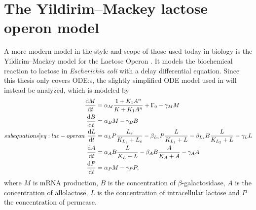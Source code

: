 \section{The Yildirim--Mackey lactose operon model}

A more modern model in the style and scope of those used today in biology is the Yildirim--Mackey model for the Lactose Operon \cite{yildirim2003feedback}.
It models the biochemical reaction to lactose in \textit{Escherichia coli} with a delay differential equation.
Since this thesis only covers ODE:s, the slightly simplified ODE model used in \cite{yildirim2011deterministic} will instead be analyzed, which is modeled by
\begin{subequations} \label[subequations]{eq:lac-operon}
  \begin{align}
    \diff{M}{t} &= \alpha_M \frac{1 + K_1 A^n}{K + K_1 A^n} + \Gamma_0 - \gamma_M M \label{eq:lac-operon-a}\\
    \diff{B}{t} &= \alpha_B M - \gamma_B B \\
    \diff{L}{t} &= \alpha_L P \frac{L_e}{K_{L_e} + L_e} - \beta_{L_1} P \frac{L}{K_{L_1} + L} - \beta_{L_2} B \frac{L}{K_{L_2} + L} - \gamma_L L \\
    \diff{A}{t} &= \alpha_A B \frac{L}{K_L + L} - \beta_A B \frac{A}{K_A + A} - \gamma_A A \\
    \diff{P}{t} &= \alpha_P M - \gamma_P P,
  \end{align}
\end{subequations}
where \(M\) is mRNA production, \(B\) is the concentration of \(\beta\)-galactosidase, \(A\) is the concentration of allolactose, \(L\) is the concentration of intracellular lactose and \(P\) the concentration of permease.
